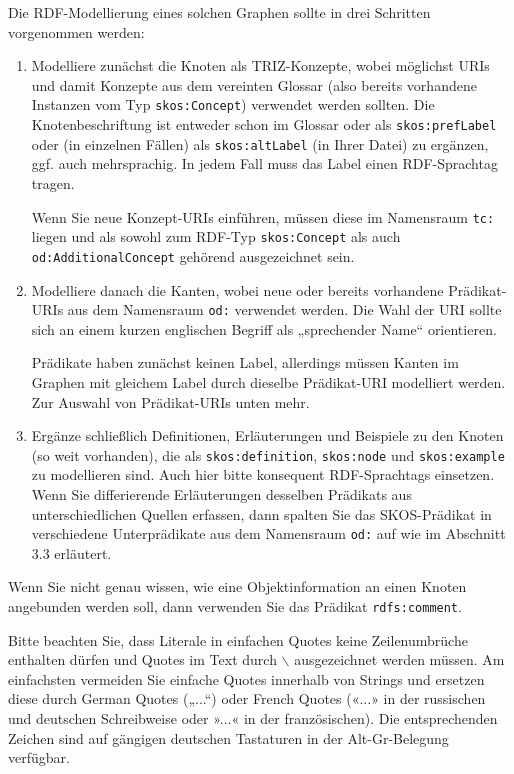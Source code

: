 \documentclass[11pt,a4paper]{article}
\begin{document}
Die RDF-Modellierung eines solchen Graphen sollte in drei Schritten
vorgenommen werden:
\begin{enumerate}
\item Modelliere zunächst die Knoten als TRIZ-Konzepte, wobei möglichst URIs
  und damit Konzepte aus dem vereinten Glossar (also bereits vorhandene
  Instanzen vom Typ \texttt{skos:Concept}) verwendet werden sollten.  Die
  Knotenbeschriftung ist entweder schon im Glossar oder als
  \texttt{skos:prefLabel} oder (in einzelnen Fällen) als
  \texttt{skos:altLabel} (in Ihrer Datei) zu ergänzen, ggf. auch
  mehrsprachig. In jedem Fall muss das Label einen RDF-Sprachtag tragen.

  Wenn Sie neue Konzept-URIs einführen, müssen diese im Namensraum
  \texttt{tc:} liegen und als sowohl zum RDF-Typ \texttt{skos:Concept} als
  auch \texttt{od:AdditionalConcept} gehörend ausgezeichnet sein.
\item Modelliere danach die Kanten, wobei neue oder bereits vorhandene
  Prädikat-URIs aus dem Namensraum \texttt{od:} verwendet werden.  Die Wahl
  der URI sollte sich an einem kurzen englischen Begriff als „sprechender
  Name“ orientieren.

  Prädikate haben zunächst keinen Label, allerdings müssen Kanten im Graphen
  mit gleichem Label durch dieselbe Prädikat-URI modelliert werden.  Zur
  Auswahl von Prädikat-URIs unten mehr. 
\item Ergänze schließlich Definitionen, Erläuterungen und Beispiele zu den
  Knoten (so weit vorhanden), die als \texttt{skos:definition},
  \texttt{skos:node} und \texttt{skos:example} zu modellieren sind. Auch hier
  bitte konsequent RDF-Sprachtags einsetzen. Wenn Sie differierende
  Erläuterungen desselben Prädikats aus unterschiedlichen Quellen erfassen,
  dann spalten Sie das SKOS-Prädikat in verschiedene Unterprädikate aus dem
  Namensraum \texttt{od:} auf wie im Abschnitt 3.3 erläutert.
\end{enumerate}
Wenn Sie nicht genau wissen, wie eine Objektinformation an einen Knoten
angebunden werden soll, dann verwenden Sie das Prädikat
\texttt{rdfs:comment}.

Bitte beachten Sie, dass Literale in einfachen Quotes keine Zeilenumbrüche
enthalten dürfen und Quotes im Text durch $\backslash$ ausgezeichnet werden
müssen. Am einfachsten vermeiden Sie einfache Quotes innerhalb von Strings und
ersetzen diese durch German Quotes („...“) oder French Quotes («...» in der
russischen und deutschen Schreibweise oder »...« in der französi\-schen).  Die
entsprechenden Zeichen sind auf gängigen deutschen Tastaturen in der
Alt-Gr-Belegung verfügbar. 
\end{document}
